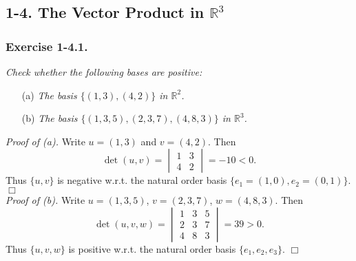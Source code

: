 \documentclass{article}
\begin{document}



\subsection*{1-4. The Vector Product in $\mathbb{R}^{3}$ \\}



\subsubsection*{Exercise 1-4.1.}
\emph{Check whether the following bases are positive:}
\begin{enumerate}
\item[(a)]
  \emph{The basis $\{(1,3), (4,2)\}$ in $\mathbb{R}^2$.}

\item[(b)]
  \emph{The basis $\{(1,3,5), (2,3,7), (4,8,3)\}$ in $\mathbb{R}^3$.} \\
\end{enumerate}



\emph{Proof of (a).}
Write $u = (1,3)$ and $v = (4,2)$.
Then
\[
  \det(u,v)
  = \begin{vmatrix}
    1 & 3 \\
    4 & 2
    \end{vmatrix}
  = -10 < 0.
\]
Thus $\{u,v\}$ is negative w.r.t. the natural order basis $\{ e_1 = (1,0), e_2 = (0,1) \}$.
$\Box$ \\

\emph{Proof of (b).}
Write $u = (1,3,5)$, $v = (2,3,7)$, $w = (4,8,3)$.
Then
\[
  \det(u,v,w)
  = \begin{vmatrix}
    1 & 3 & 5 \\
    2 & 3 & 7 \\
    4 & 8 & 3
    \end{vmatrix}
  = 39 > 0.
\]
Thus $\{u,v,w\}$ is positive w.r.t. the natural order basis $\{ e_1, e_2, e_3 \}$.
$\Box$ \\\\



\end{document}
